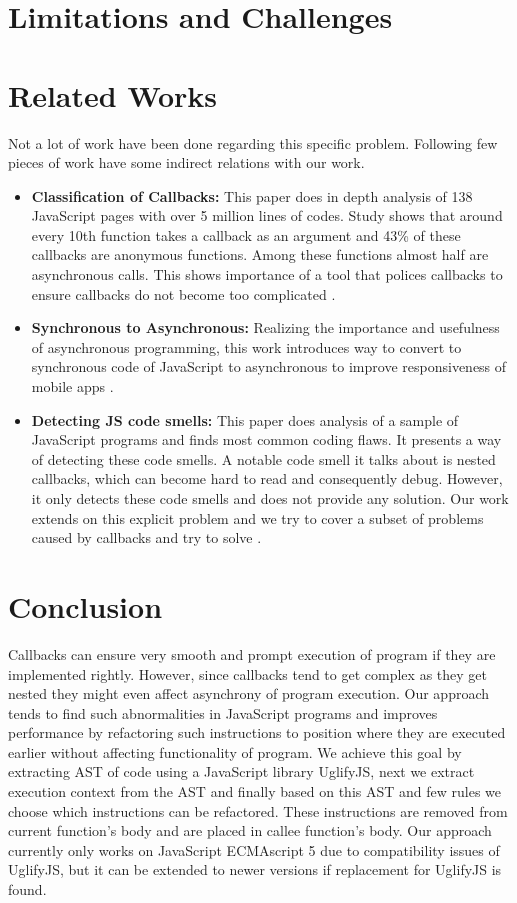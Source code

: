 \documentclass[10pt,conference]{IEEEtran}
\begin{document}
\section{Limitations and Challenges}
\section{Related Works}
Not a lot of work have been done regarding this specific problem. Following few pieces of work have some indirect relations with our work. 
\begin{itemize}
	\item {\textbf{Classification of Callbacks:}
		This paper does in depth analysis of 138 JavaScript pages with over 5 million 
		lines of codes. Study shows that around every 10th function takes a callback as an argument and 43\% of these callbacks are anonymous functions. Among these functions almost half are asynchronous calls. This shows importance of a tool that polices callbacks to ensure callbacks do not become too complicated \cite{b3}. 
	}
	\item{\textbf{Synchronous to Asynchronous:}
		Realizing the importance and usefulness of asynchronous programming, this work introduces way to convert to synchronous code of JavaScript to asynchronous to improve responsiveness of mobile apps \cite{b1}. 
	}
	\item{\textbf{Detecting JS code smells:}
		This paper does analysis of a sample of JavaScript programs and finds most common coding flaws. It presents a way of detecting these code smells. A notable code smell it talks about is nested callbacks, which can become hard to read and consequently debug. However, it only detects these code smells and does not provide any solution. Our work extends on this explicit problem and we try to cover a subset of problems caused by callbacks and try to solve \cite{b2}. 
	}
\end{itemize}
\section{Conclusion}
Callbacks can ensure very smooth and prompt execution of program if they are implemented rightly. However, since callbacks tend to get complex as they get nested they might even affect asynchrony of program execution. Our approach tends to find such abnormalities in JavaScript programs and improves performance by refactoring such instructions to position where they are executed earlier without affecting functionality of program. We achieve this goal by extracting AST of code using a JavaScript library UglifyJS, next we extract execution context from the AST and finally based on this AST and few rules we choose which instructions can be refactored. These instructions are removed from current function’s body and are placed in callee function’s body. Our approach currently only works on JavaScript ECMAscript 5 due to compatibility issues of UglifyJS, but it can be extended to newer versions if replacement for UglifyJS is found. 
\end{document}
